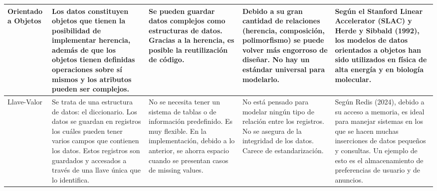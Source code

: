 \documentclass[12pt]{report}
\begin{document}
\begin{enumerate}[label=\textbf{\arabic*.}, leftmargin=*]
\begin{enumerate}[label=\textbf{\alph*.}, leftmargin=*, itemsep=1.0em]
\begin{itemize}
\begin{longtable}{|p{2.5cm}|p{3.5cm}|p{3.5cm}|p{3.5cm}|p{3.5cm}|}
        Orientado a Objetos & Los datos constituyen objetos que tienen la posibilidad de implementar herencia, además de que los objetos tienen definidas operaciones sobre sí mismos y los atributos pueden ser complejos. & Se pueden guardar datos complejos como estructuras de datos. Gracias a la herencia, es posible la reutilización de código. & Debido a su gran cantidad de relaciones (herencia, composición, polimorfismo) se puede volver más engorroso de diseñar. No hay un estándar universal para modelarlo. & Según el Stanford Linear Accelerator (SLAC) y Herde y Sibbald (1992), los modelos de datos orientados a objetos han sido utilizados en física de alta energía y en biología molecular. \\
        \hline

        Llave-Valor & Se trata de una estructura de datos: el diccionario. Los datos se guardan en registros los cuáles pueden tener varios campos que contienen los datos. Estos registros son guardados y accesados a través de una llave única que lo identifica. & No se necesita tener un sistema de tablas o de información predefinido. Es muy flexible. En la implementación, debido a lo anterior, se ahorra espacio cuando se presentan casos de missing values. & No está pensado para modelar ningún tipo de relación entre los registros. No se asegura de la integridad de los datos. Carece de estandarización. & Según Redis (2024), debido a su acceso a memoria, es ideal para manejar sistemas en los que se hacen muchas inserciones de datos pequeños y consultas. Un ejemplo de esto es el almacenamiento de preferencias de usuario y de anuncios. \\
        \hline

\end{longtable}


\end{itemize}
\end{enumerate}
\end{enumerate}
\end{document}
